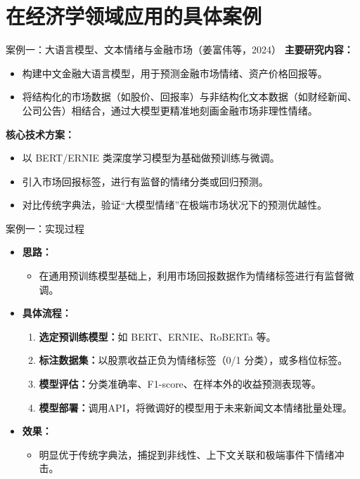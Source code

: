 \documentclass{beamer}
\begin{document}
\section{在经济学领域应用的具体案例}
\begin{frame}{案例一：大语言模型、文本情绪与金融市场（姜富伟等，2024）}
    \textbf{主要研究内容：}
    \begin{itemize}
      \item 构建中文金融大语言模型，用于预测金融市场情绪、资产价格回报等。
      \item 将结构化的市场数据（如股价、回报率）与非结构化文本数据（如财经新闻、公司公告）相结合，通过大模型更精准地刻画金融市场非理性情绪。
    \end{itemize}
    
    \textbf{核心技术方案：}
    \begin{itemize}
      \item 以 BERT/ERNIE 类深度学习模型为基础做预训练与微调。
      \item 引入市场回报标签，进行有监督的情绪分类或回归预测。
      \item 对比传统字典法，验证“大模型情绪”在极端市场状况下的预测优越性。
    \end{itemize}
    \end{frame}
    
    \begin{frame}{案例一：实现过程}
    \begin{itemize}
      \item \textbf{思路：} 
      \begin{itemize}
        \item 在通用预训练模型基础上，利用市场回报数据作为情绪标签进行有监督微调。
      \end{itemize}
      \item \textbf{具体流程：}
      \begin{enumerate}
        \item \textbf{选定预训练模型：}如 BERT、ERNIE、RoBERTa 等。
        \item \textbf{标注数据集：}以股票收益正负为情绪标签（0/1 分类），或多档位标签。
        \item \textbf{模型评估：}分类准确率、F1-score、在样本外的收益预测表现等。
        \item \textbf{模型部署：}调用API，将微调好的模型用于未来新闻文本情绪批量处理。
      \end{enumerate}
      \item \textbf{效果：}
      \begin{itemize}
        \item 明显优于传统字典法，捕捉到非线性、上下文关联和极端事件下情绪冲击。
      \end{itemize}
    \end{itemize}
    \end{frame}
    
\end{document}
